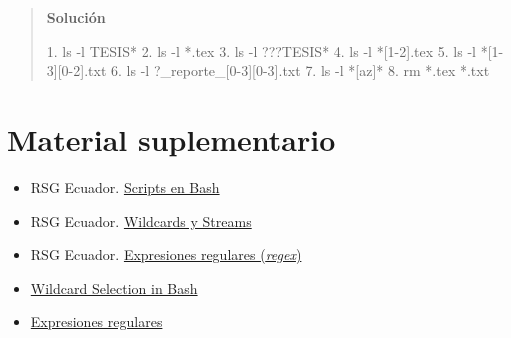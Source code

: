 \documentclass[
  spanish,
  12pt,
  letterpaper,
  DIV=11,
  numbers=noendperiod]{scrreprt}
\newenvironment{Shaded}{\begin{snugshade}}{\end{snugshade}}
\newcommand{\AttributeTok}[1]{\textcolor[rgb]{0.40,0.45,0.13}{#1}}
\newcommand{\ExtensionTok}[1]{\textcolor[rgb]{0.00,0.23,0.31}{#1}}
\newcommand{\NormalTok}[1]{\textcolor[rgb]{0.00,0.23,0.31}{#1}}
\newcommand{\PreprocessorTok}[1]{\textcolor[rgb]{0.68,0.00,0.00}{#1}}
\newcommand{\SpecialStringTok}[1]{\textcolor[rgb]{0.13,0.47,0.30}{#1}}
\providecommand{\tightlist}{%
  \setlength{\itemsep}{0pt}\setlength{\parskip}{0pt}}
\begin{document}
\begin{tcolorbox}
\begin{enumerate}
  \begin{quote}
  \textbf{Solución}

\begin{Shaded}
\begin{Highlighting}[]
\ExtensionTok{1.}\NormalTok{ ls }\AttributeTok{{-}l}\NormalTok{ TESIS}\PreprocessorTok{*}
\ExtensionTok{2.}\NormalTok{ ls }\AttributeTok{{-}l} \PreprocessorTok{*}\NormalTok{.tex}
\ExtensionTok{3.}\NormalTok{ ls }\AttributeTok{{-}l} \PreprocessorTok{???}\NormalTok{TESIS}\PreprocessorTok{*}
\ExtensionTok{4.}\NormalTok{ ls }\AttributeTok{{-}l} \PreprocessorTok{*[}\SpecialStringTok{1}\PreprocessorTok{{-}}\SpecialStringTok{2}\PreprocessorTok{]}\NormalTok{.tex}
\ExtensionTok{5.}\NormalTok{ ls }\AttributeTok{{-}l} \PreprocessorTok{*[}\SpecialStringTok{1}\PreprocessorTok{{-}}\SpecialStringTok{3}\PreprocessorTok{][}\SpecialStringTok{0}\PreprocessorTok{{-}}\SpecialStringTok{2}\PreprocessorTok{]}\NormalTok{.txt}
\ExtensionTok{6.}\NormalTok{ ls }\AttributeTok{{-}l} \PreprocessorTok{?}\NormalTok{\_reporte\_}\PreprocessorTok{[}\SpecialStringTok{0}\PreprocessorTok{{-}}\SpecialStringTok{3}\PreprocessorTok{][}\SpecialStringTok{0}\PreprocessorTok{{-}}\SpecialStringTok{3}\PreprocessorTok{]}\NormalTok{.txt}
\ExtensionTok{7.}\NormalTok{ ls }\AttributeTok{{-}l} \PreprocessorTok{*[}\SpecialStringTok{az}\PreprocessorTok{]*}
\ExtensionTok{8.}\NormalTok{ rm }\PreprocessorTok{*}\NormalTok{.tex }\PreprocessorTok{*}\NormalTok{.txt}
\end{Highlighting}
\end{Shaded}
  \end{quote}
\end{enumerate}

\end{tcolorbox}

\section{Material suplementario}\label{material-suplementario-2}

\begin{itemize}
\tightlist
\item
  RSG Ecuador.
  \href{https://rsg-ecuador.github.io/unix.bioinfo.rsgecuador/content/Curso_avanzado/02_Bash/1_bash.html}{Scripts
  en Bash}
\item
  RSG Ecuador.
  \href{https://rsg-ecuador.github.io/unix.bioinfo.rsgecuador/content/Curso_basico/03_Manejo_terminal/5_wildcards.html}{Wildcards
  y Streams}
\item
  RSG Ecuador.
  \href{https://rsg-ecuador.github.io/unix.bioinfo.rsgecuador/content/Curso_basico/04_Procesamiento_ficheros_regex_pipes/3_Expresiones_regulares.html}{Expresiones
  regulares (\emph{regex})}
\item
  \href{https://pressbooks.senecapolytechnic.ca/uli101/chapter/wildcard-selection-in-bash/}{Wildcard
  Selection in Bash}
\item
  \href{https://twiki.org/cgi-bin/view/Codev/TWikiPresentation2017x06x01Regex}{Expresiones
  regulares}
\end{itemize}
\end{document}
